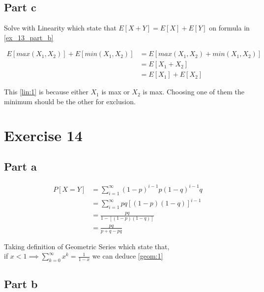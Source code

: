 \documentclass[12pt, a4paper]{article}
\begin{document}
\subsection{Part c} \label{ex_13_part_c}

Solve with Linearity which state that $E[X+Y] = E[X] + E[Y]$ on formula in \ref{ex_13_part_b}

\begin{subequations}
  \begin{align}
    E[max(X_1,X_2)] + E[min(X_1,X_2)] &= E[max(X_1,X_2) + min(X_1,X_2)] \label{lin:1} \\
                                      &= E[X_1 + X_2] \\
                                      &= E[X_1] + E[X_2]                  
  \end{align}
\end{subequations}

This \ref{lin:1} is because either $X_1$ is max or $X_2$ is max. Choosing one of
them the minimum should be the other for exclusion.


\section{Exercise 14}
\subsection{Part a}

\begin{subequations}
  \begin{align}
    P[X = Y] &= \displaystyle\sum_{i=1}^{\infty}(1-p)^{i-1}p(1-q)^{i-1}q \\
             &= \displaystyle\sum_{i=1}^{\infty}pq [(1-p)(1-q)]^{i-1} \\
             &= \frac{pq}{1-[(1-p)(1-q)]} \label{geom:1} \\
             &= \frac{pq}{p + q - pq}
  \end{align}
\end{subequations}

Taking definition of Geometric Series which state that, \\

\label{fact:1} if $x < 1 \implies \displaystyle\sum_{k=0}^{\infty} x^k = \frac{1}{1-x}$ we can deduce \ref{geom:1}

\subsection{Part b}
\end{document}
